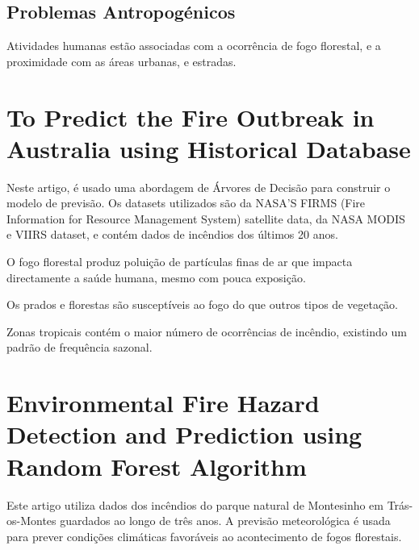 \documentclass{article}
\begin{document}
\subsection{Problemas Antropogénicos}
Atividades humanas estão associadas com a ocorrência de fogo florestal, e a proximidade com as áreas urbanas, e estradas.


\section{To Predict the Fire Outbreak in Australia using 
Historical Database \cite{9964603}}
Neste artigo, é usado uma abordagem de Árvores de Decisão para construir o modelo de previsão. Os datasets utilizados são da NASA'S FIRMS (Fire Information for Resource Management System) satellite data, da NASA MODIS e VIIRS dataset, e contém dados de incêndios dos últimos 20 anos.\par
O fogo florestal produz poluição de partículas finas de ar que impacta directamente a saúde humana, mesmo com pouca exposição.\par
Os prados e florestas são susceptíveis ao fogo do que
outros tipos de vegetação.\par
Zonas tropicais contém o maior número de ocorrências de incêndio, existindo um padrão de frequência sazonal.



\section{Environmental Fire Hazard Detection and 
Prediction using Random Forest Algorithm \cite{9726029}}
Este artigo utiliza dados dos incêndios do parque natural de Montesinho em Trás-os-Montes guardados ao longo de três anos.
A previsão meteorológica é usada para prever condições climáticas favoráveis ao acontecimento de fogos florestais.
\end{document}
